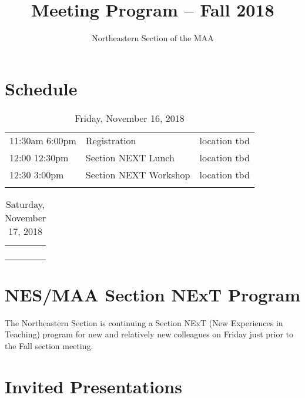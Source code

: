 \documentclass[10pt,]{article}
\title{Meeting Program -- Fall 2018}
\author{Northeastern Section of the MAA
}
\date{}
\theoremstyle{plain}
\begin{document}
\hypertarget{index}{}
\maketitle
\thispagestyle{empty}
\typeout{************************************************}
\typeout{************************************************}
\section[{Schedule}]{Schedule}\label{section-1}
\leavevmode%
\begin{table}
\centering
\begin{tabular}{lll}
11:30am \textemdash{} 6:00pm&Registration&location tbd\tabularnewline[0pt]
12:00 \textemdash{} 12:30pm&Section NEXT Lunch&location tbd\tabularnewline[0pt]
12:30 \textemdash{} 3:00pm&Section NEXT Workshop&location tbd\tabularnewline[0pt]
&&
\end{tabular}
\caption{Friday, November 16, 2018\label{table-1}}
\end{table}
\begin{table}
\centering
\begin{tabular}{lll}
&&\tabularnewline[0pt]
&&\tabularnewline[0pt]
&&\tabularnewline[0pt]
&&
\end{tabular}
\caption{Saturday, November 17, 2018\label{table-2}}
\end{table}
\typeout{************************************************}
\typeout{************************************************}
\section[{NES/MAA Section NExT Program}]{NES/MAA Section NExT Program}\label{section-2}
\hypertarget{p-1}{}%
The Northeastern Section is continuing a Section NExT (New Experiences in Teaching) program for new and relatively new colleagues on Friday just prior to the Fall section meeting.%
\typeout{************************************************}
\typeout{************************************************}
\section[{Invited Presentations}]{Invited Presentations}\label{section-3}
\typeout{************************************************}
\typeout{************************************************}
\end{document}
